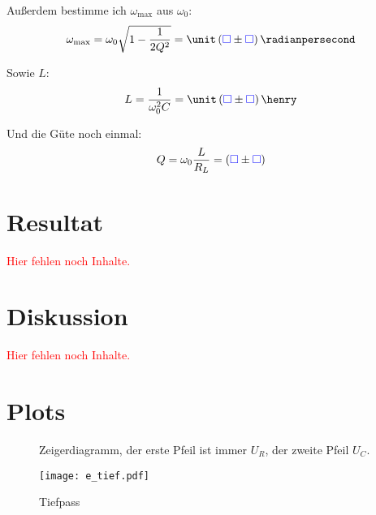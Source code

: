\documentclass[11pt, ngerman]{article}
\newcommand{\emesswert}{\left(\messwert \pm \messwert \right)}
\newcommand{\fehlt}{\textcolor{red}{Hier fehlen noch Inhalte.}}
\newcommand{\messwert}{\textcolor{blue}{\square}}
\begin{document}
Außerdem bestimme ich $\omega_\text{max}$ aus $\omega_0$:
\[
	\omega_\text{max} = \omega_0 \sqrt{1 - \frac{1}{2 Q^2}} = \unit\emesswert\radianpersecond
\]

Sowie $L$:
\[
	L = \frac{1}{\omega_0^2 C} = \unit\emesswert\henry
\]

Und die Güte noch einmal:
\[
	Q = \omega_0 \frac{L}{R_L} = \emesswert
\]


\section{Resultat}

\fehlt


\section{Diskussion}

\fehlt

%
%

\newpage


\section{Plots}

\begin{figure}[h]
	\centering
	
	\caption{Zeigerdiagramm, der erste Pfeil ist immer $U_R$, der zweite Pfeil $U_C$.}
	\label{fig:Aufgabe d}
\end{figure}

\begin{figure}[h]
	\centering
	\texttt{[image: e\_tief.pdf]}
	\caption{Tiefpass}
	\label{fig:Aufgabe e Tiefpass}
\end{figure}
\end{document}
